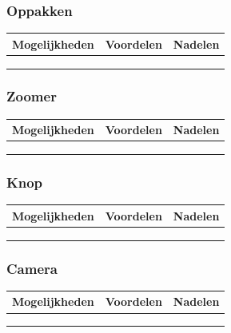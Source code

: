 \documentclass[12pt]{article} %
\begin{document}
\subsubsection{Oppakken}
\begin{table}[h]
\begin{tabular}{|l|l|l|}
\hline
{\color[HTML]{3166FF} \textbf{Mogelijkheden}} & {\color[HTML]{3166FF} \textbf{Voordelen}} & {\color[HTML]{3166FF} \textbf{Nadelen}} \\ \hline
 &  & 		\\ \hline
 &  & 		\\ \hline
 &  &  		\\ \hline
\end{tabular}
\end{table}
\subsubsection{Zoomer}
\begin{table}[h]
\begin{tabular}{|l|l|l|}
\hline
{\color[HTML]{3166FF} \textbf{Mogelijkheden}} & {\color[HTML]{3166FF} \textbf{Voordelen}} & {\color[HTML]{3166FF} \textbf{Nadelen}} \\ \hline
 &  & 		\\ \hline
 &  & 		\\ \hline
 &  &  		\\ \hline
\end{tabular}
\end{table}
\subsubsection{Knop}
\begin{table}[h]
\begin{tabular}{|l|l|l|}
\hline
{\color[HTML]{3166FF} \textbf{Mogelijkheden}} & {\color[HTML]{3166FF} \textbf{Voordelen}} & {\color[HTML]{3166FF} \textbf{Nadelen}} \\ \hline
 &  & 		\\ \hline
 &  & 		\\ \hline
 &  &  		\\ \hline
\end{tabular}
\end{table}
\subsubsection{Camera}
\begin{table}[h]
\begin{tabular}{|l|l|l|}
\hline
{\color[HTML]{3166FF} \textbf{Mogelijkheden}} & {\color[HTML]{3166FF} \textbf{Voordelen}} & {\color[HTML]{3166FF} \textbf{Nadelen}} \\ \hline
 &  & 		\\ \hline
 &  & 		\\ \hline
 &  &  		\\ \hline
\end{tabular}
\end{table}
\end{document}
